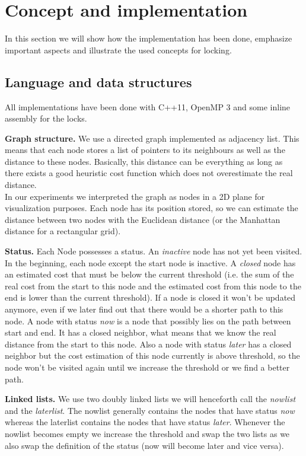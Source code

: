 \documentclass[letterpaper]{article}
\newcommand{\mypar}[1]{{\bf #1.}}
\begin{document}
\section{Concept and implementation}\label{sec:impl}

In this section we will show how the implementation has been done, emphasize important aspects and illustrate the used concepts for locking. 

\subsection{Language and data structures}\label{ssec:lang}

All implementations have been done with C++11, OpenMP 3 and some inline assembly for the locks.

\mypar{Graph structure}
We use a directed graph implemented as adjacency list. This means that each node stores a list of pointers to its neighbours as well as the distance to these nodes. Basically, this distance can be everything as long as there exists a good heuristic cost function which does not overestimate the real distance. \\
In our experiments we interpreted the graph as nodes in a 2D plane for visualization purposes. Each node has its position stored, so we can estimate the distance between two nodes with the Euclidean distance (or the Manhattan distance for a rectangular grid).

\mypar{Status}
Each Node possesses a status. An \textit{inactive} node has not yet been visited. In the beginning, each node except the start node is inactive. A \textit{closed} node has an estimated cost that must be below the current threshold (i.e. the sum of the real cost from the start to this node and the estimated cost from this node to the end is lower than the current threshold). If a node is closed it won't be updated anymore, even if we later find out that there would be a shorter path to this node. A node with status \textit{now} is a node that possibly lies on the path between start and end. It has a closed neighbor, what means that we know the real distance from the start to this node. Also a node with status \textit{later} has a closed neighbor but the cost estimation of this node currently is above threshold, so the node won't be visited again until we increase the threshold or we find a better path.

\mypar{Linked lists}
We use two doubly linked lists we will henceforth call the \textit{nowlist} and the \textit{laterlist}. The nowlist generally contains the nodes that have status \textit{now} whereas the laterlist contains the nodes that have status \textit{later}. Whenever the nowlist becomes empty we increase the threshold and swap the two lists as we also swap the definition of the status (now will become later and vice versa). 
\end{document}
